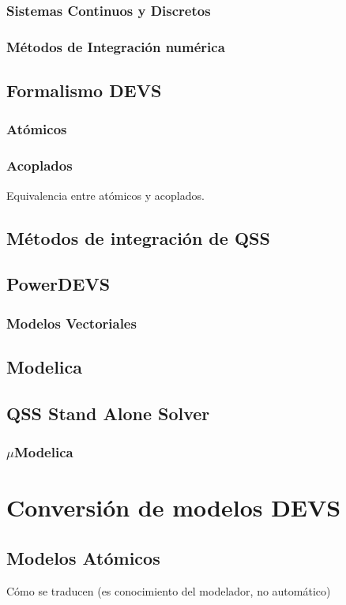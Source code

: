 \documentclass[a4paper,	11pt]{article}
\begin{document}
\subsubsection{Sistemas Continuos y Discretos}
\subsubsection{Métodos de Integración numérica}
\subsection{Formalismo DEVS}
\subsubsection{Atómicos }
\subsubsection{Acoplados}
Equivalencia entre atómicos y acoplados.

\subsection {Métodos de integración de QSS}
\subsection {PowerDEVS}
\subsubsection{Modelos Vectoriales}
\subsection{Modelica}
\subsection{QSS Stand Alone Solver}
\subsubsection{$\mu$Modelica}

\section{Conversión de modelos DEVS}
\subsection{Modelos Atómicos}
Cómo se traducen (es conocimiento del modelador, no automático)
\end{document}
